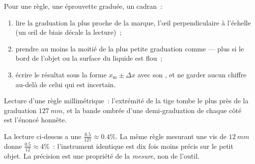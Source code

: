 \begin{method}\label{met:g10:orders-of-magnitude:reading}
Pour une règle, une éprouvette graduée, un cadran~:
\begin{enumerate}
  \item lire la graduation la plus proche de la marque, l'œil
        perpendiculaire à l'échelle (un œil de biais décale la
        lecture)~;
  \item prendre au moins la moitié de la plus petite graduation comme
         --- plus si le bord de l'objet ou la
        surface du liquide est flou~;
  \item écrire le résultat sous la forme $x_{\text{m}} \pm \Delta x$
        avec son , et ne garder aucun chiffre au-delà de celui
        qui est incertain.
\end{enumerate}
\end{method}

\begin{omfigure}

{\small Lecture d'une règle millimétrique~: l'extrémité de la tige
tombe le plus près de la graduation $\qty{127}{mm}$, et la bande
ombrée d'une demi-graduation de chaque côté est l'énoncé honnête.}
\end{omfigure}

\begin{example}\label{ex:g10:orders-of-magnitude:reading}
La lecture ci-dessus a une 
$\frac{0.5}{127} \approx 0.4\%$. La même règle mesurant une vis de
$\qty{12}{mm}$ donne $\frac{0.5}{12} \approx 4\%$~: l'instrument
identique est dix fois moins précis sur le petit objet. La précision
est une propriété de la \emph{mesure}, non de l'outil.
\end{example}

